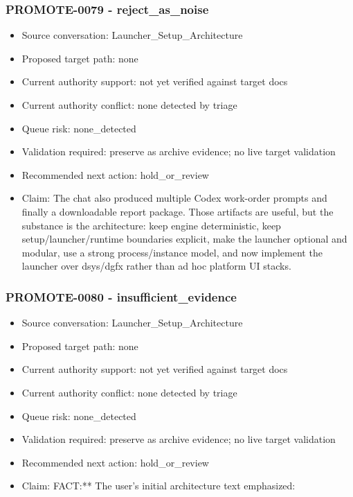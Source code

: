 \documentclass[11pt,a4paper]{report}
\begin{document}
\subsubsection{PROMOTE-0079 - reject\_as\_noise}

\begin{itemize}
\item Source conversation: Launcher\_Setup\_Architecture
\item Proposed target path: none
\item Current authority support: not yet verified against target docs
\item Current authority conflict: none detected by triage
\item Queue risk: none\_detected
\item Validation required: preserve as archive evidence; no live target validation
\item Recommended next action: hold\_or\_review
\item Claim: The chat also produced multiple Codex work-order prompts and finally a downloadable report package. Those artifacts are useful, but the substance is the architecture: keep engine deterministic, keep setup/launcher/runtime boundaries explicit, make the launcher optional and modular, use a strong process/instance model, and now implement the launcher over dsys/dgfx rather than ad hoc platform UI stacks.
\end{itemize}

\subsubsection{PROMOTE-0080 - insufficient\_evidence}

\begin{itemize}
\item Source conversation: Launcher\_Setup\_Architecture
\item Proposed target path: none
\item Current authority support: not yet verified against target docs
\item Current authority conflict: none detected by triage
\item Queue risk: none\_detected
\item Validation required: preserve as archive evidence; no live target validation
\item Recommended next action: hold\_or\_review
\item Claim: FACT:** The user's initial architecture text emphasized:
\end{itemize}
\end{document}

